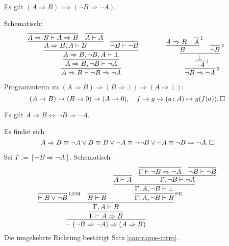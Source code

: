 \begin{Satz}[Kontrapositionsableitung]\label{contrapos-intro}\newlinefirst
Es gilt $(A\Rightarrow B)\implies (\neg B\Rightarrow\neg A)$.
\end{Satz}
\begin{Beweis}[Beweis] Schematisch:
\[
\begin{array}{@{}l@{\qquad\qquad}l}
\infer{A\Rightarrow B\vdash \neg B\Rightarrow\neg A}{
  \infer{A\Rightarrow B, \neg B\vdash\neg A}{
    \infer{A\Rightarrow B, \neg B, A\vdash\bot}{
      \infer{A\Rightarrow B, A\vdash B}{
        \infer{A\Rightarrow B\vdash A\Rightarrow B}{}
      & \infer{A\vdash A}{}}
    & \infer{\neg B\vdash\neg B}{}}}}
&
\infer[\infernote{2}]{\neg B\Rightarrow\neg A}{
  \infer[\infernote{1}]{\neg A}{
    \infer{\bot}{
      \infer{B}{A\Rightarrow B & \infer[\infernote{1}]{A}{}}
    & \infer[\infernote{2}]{\neg B}{}}}}
\end{array}
\]
Programmterm zu $(A\Rightarrow B)\Rightarrow (B\Rightarrow\bot)\Rightarrow (A\Rightarrow\bot)$:
\[(A\to B)\to (B\to 0)\to (A\to 0),\quad
f\mapsto g\mapsto (a\colon A)\mapsto g(f(a)).\,\square\]
\end{Beweis}

\begin{Satz}[Kontraposition] \strong{[LEM]}\newlinefirst
Es gilt $A\Rightarrow B \iff \neg B\Rightarrow\neg A$.
\end{Satz}
\begin{Beweis}
Es findet sich
\[A\Rightarrow B \equiv \neg A\lor B\equiv B\lor\neg A
\equiv \neg\neg B\lor\neg A \equiv \neg B\Rightarrow \neg A.\,\square\]
\end{Beweis}
\begin{Beweis}
Sei $\Gamma:=[\neg B\Rightarrow\neg A]$. Schematisch
\[
\infer{\vdash (\neg B\Rightarrow\neg A)\Rightarrow (A\Rightarrow B)}{
  \infer{\Gamma\vdash A\Rightarrow B}{
    \infer{\Gamma,A\vdash B}{
      \infer[\infernote{LEM}]{\vdash B\lor \neg B}{}
      & \infer{B\vdash B}{}
      & \infer[\infernote{PE}]{\Gamma,A,\neg B\vdash B}{
        \infer{\Gamma,A,\neg B\vdash\bot}{
          \infer{A\vdash A}{}
          & \infer{\Gamma,\neg B\vdash\neg A}{
            \infer{\Gamma\vdash\neg B\Rightarrow\neg A}{}
            & \infer{\neg B\vdash\neg B}{}}}}}}}
\]
Die umgekehrte Richtung bestätigt Satz \ref{contrapos-intro}.\,\qedsymbol
\end{Beweis}


